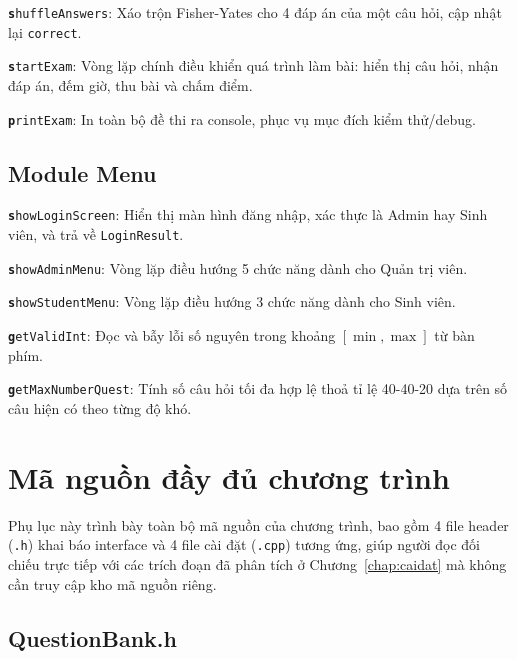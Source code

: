 \documentclass[11pt]{report}
\begin{document}
\texttt{\textbf shuffleAnswers}: Xáo trộn Fisher-Yates cho 4 đáp án của một câu hỏi, cập nhật lại \texttt{correct}. 

\texttt{\textbf startExam}: Vòng lặp chính điều khiển quá trình làm bài: hiển thị câu hỏi, nhận đáp án, đếm giờ, thu bài và chấm điểm. 

\texttt{\textbf printExam}: In toàn bộ đề thi ra console, phục vụ mục đích kiểm thử/debug. 

\section{Module Menu}

\texttt{\textbf showLoginScreen}: Hiển thị màn hình đăng nhập, xác thực là Admin hay Sinh viên, và trả về \texttt{LoginResult}. 

\texttt{\textbf showAdminMenu}: Vòng lặp điều hướng 5 chức năng dành cho Quản trị viên. 

\texttt{\textbf showStudentMenu}: Vòng lặp điều hướng 3 chức năng dành cho Sinh viên. 

\texttt{\textbf getValidInt}: Đọc và bẫy lỗi số nguyên trong khoảng $[\min, \max]$ từ bàn phím. 

\texttt{\textbf getMaxNumberQuest}: Tính số câu hỏi tối đa hợp lệ thoả tỉ lệ 40-40-20 dựa trên số câu hiện có theo từng độ khó. 

\chapter{Mã nguồn đầy đủ chương trình}
\label{appendix:fullsource}

Phụ lục này trình bày toàn bộ mã nguồn của chương trình, bao gồm 4 file header (\texttt{.h}) khai báo interface và 4 file cài đặt (\texttt{.cpp}) tương ứng, giúp người đọc đối chiếu trực tiếp với các trích đoạn đã phân tích ở Chương~\ref{chap:caidat} mà không cần truy cập kho mã nguồn riêng.

\section{QuestionBank.h}
\end{document}
